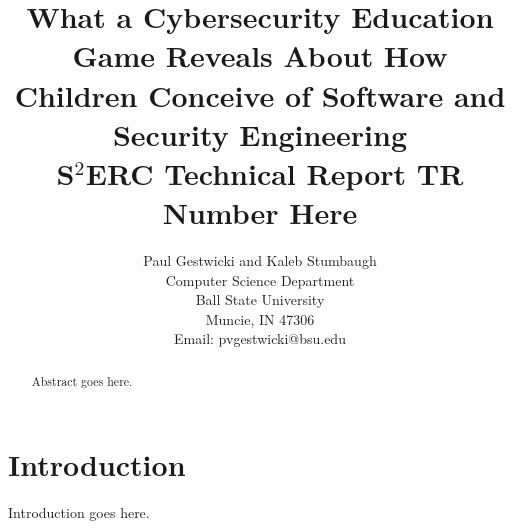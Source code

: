 \documentclass[letterpaper]{article}
\title{What a Cybersecurity Education Game Reveals About How Children Conceive of Software and Security Engineering\\
\medskip
S$^2$ERC Technical Report \textbf{TR Number Here}\\
}
\author{Paul Gestwicki and Kaleb Stumbaugh\\
Computer Science Department\\
Ball State University\\
Muncie, IN 47306\\
Email: pvgestwicki@bsu.edu}
\begin{document}
\maketitle


\begin{abstract}
  Abstract goes here.
\end{abstract}

\section{Introduction}

Introduction goes here.
\end{document}
